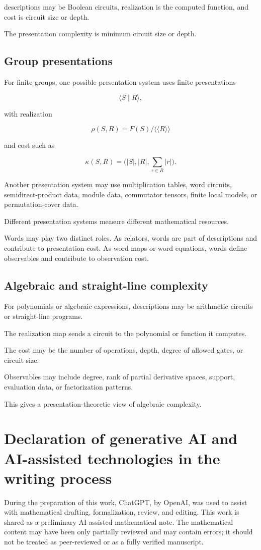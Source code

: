 \documentclass[11pt]{article}
\begin{document}
descriptions may be Boolean circuits, realization is the computed function, and cost is circuit size or depth.

The presentation complexity is minimum circuit size or depth.


\subsection{Group presentations}

For finite groups, one possible presentation system uses finite presentations

\[
\langle S\mid R\rangle,
\]

with realization

\[
\rho(S,R)=F(S)/\langle\!\langle R\rangle\!\rangle
\]

and cost such as

\[
\kappa(S,R)=\bigl(|S|,|R|,\sum_{r\in R}|r|\bigr).
\]

Another presentation system may use multiplication tables, word circuits, semidirect-product data, module data, commutator tensors, finite local models, or permutation-cover data.

Different presentation systems measure different mathematical resources.

Words may play two distinct roles. As relators, words are part of descriptions and contribute to presentation cost. As word maps or word equations, words define observables and contribute to observation cost.


\subsection{Algebraic and straight-line complexity}

For polynomials or algebraic expressions, descriptions may be arithmetic circuits or straight-line programs.

The realization map sends a circuit to the polynomial or function it computes.

The cost may be the number of operations, depth, degree of allowed gates, or circuit size.

Observables may include degree, rank of partial derivative spaces, support, evaluation data, or factorization patterns.

This gives a presentation-theoretic view of algebraic complexity.



\section*{Declaration of generative AI and AI-assisted technologies in the writing process}
During the preparation of this work, ChatGPT, by OpenAI, was used to assist with mathematical drafting, formalization, review, and editing. This work is shared as a preliminary AI-assisted mathematical note. The mathematical content may have been only partially reviewed and may contain errors; it should not be treated as peer-reviewed or as a fully verified manuscript.
\end{document}
